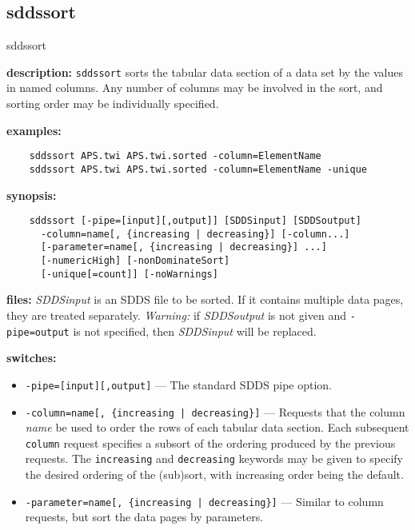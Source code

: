 \newpage
\subsection{sddssort}
\label{sddssort}

\begin{sddsprog}{sddssort}
  \item \textbf{description:} \verb|sddssort| sorts the tabular data section of a data set by the values in named columns.
    Any number of columns may be involved in the sort, and sorting order may be individually specified.
  \item \textbf{examples:}
    \begin{verbatim}
    sddssort APS.twi APS.twi.sorted -column=ElementName
    sddssort APS.twi APS.twi.sorted -column=ElementName -unique
    \end{verbatim}
  \item \textbf{synopsis:}
    \begin{verbatim}
    sddssort [-pipe=[input][,output]] [SDDSinput] [SDDSoutput]
      -column=name[, {increasing | decreasing}] [-column...]
      [-parameter=name[, {increasing | decreasing}] ...]
      [-numericHigh] [-nonDominateSort]
      [-unique[=count]] [-noWarnings]
    \end{verbatim}
  \item \textbf{files:} \emph{SDDSinput} is an SDDS file to be sorted. If it contains multiple data pages, they are treated
    separately. \emph{Warning:} if \emph{SDDSoutput} is not given and \verb|-pipe=output| is not specified, then
    \emph{SDDSinput} will be replaced.
  \item \textbf{switches:}
    \begin{itemize}
      \item \verb|-pipe=[input][,output]| --- The standard SDDS pipe option.
      \item \verb!-column=name[, {increasing | decreasing}]! --- Requests that the column \emph{name} be used to order the rows of each tabular data section. Each subsequent \verb|column| request specifies a subsort of the ordering produced by the previous requests. The \verb|increasing| and \verb|decreasing| keywords may be given to specify the desired ordering of the (sub)sort, with increasing order being the default.
      \item \verb!-parameter=name[, {increasing | decreasing}]! --- Similar to column requests, but sort the data pages by parameters.

\end{itemize}
\end{sddsprog}

